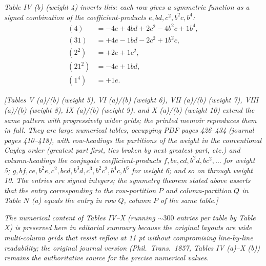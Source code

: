 \documentclass[11pt]{article}
\begin{document}
\noindent\textit{Table IV (b) (weight 4) inverts this: each row gives a symmetric function as a signed combination of the coefficient-products $e, bd, c^2, b^2 c, b^4$:}
\[
\begin{aligned}
(4)    &= -4 e + 4 bd + 2 c^2 - 4 b^2 c + 1 b^4, \\
(31)   &= +4 e - 1 bd  - 2 c^2 + 1 b^2 c, \\
(2^2)  &= +2 e        + 1 c^2, \\
(21^2) &= -4 e + 1 bd, \\
(1^4)  &= +1 e.
\end{aligned}
\]

\medskip

\noindent\textit{[Tables V (a)/(b) (weight 5), VI (a)/(b) (weight 6), VII (a)/(b) (weight 7), VIII (a)/(b) (weight 8), IX (a)/(b) (weight 9), and X (a)/(b) (weight 10) extend the same pattern with progressively wider grids; the printed memoir reproduces them in full. They are large numerical tables, occupying PDF pages 426--434 (journal pages 410--418), with row-headings the partitions of the weight in the conventional Cayley order (greatest part first, ties broken by next greatest part, etc.) and column-headings the conjugate coefficient-products $f, be, c d, b^2 d, b c^2, \ldots$ for weight 5; $g, b f, ce, b^2 e, c^2, bcd, b^3 d, c^3, b^2 c^2, b^4 c, b^6$ for weight 6; and so on through weight 10. The entries are signed integers; the symmetry theorem stated above asserts that the entry corresponding to the row-partition $P$ and column-partition $Q$ in Table $N$ (a) equals the entry in row $Q$, column $P$ of the same table.]}

\medskip

\noindent\textit{The numerical content of Tables IV--X (running ${\sim}300$ entries per table by Table X) is preserved here in editorial summary because the original layouts are wide multi-column grids that resist reflow at 11 pt without compromising line-by-line readability; the original journal version (Phil.~Trans.\ 1857, Tables IV (a)--X (b)) remains the authoritative source for the precise numerical values.}
\end{document}
